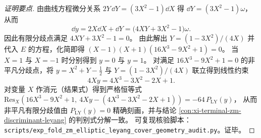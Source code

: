 \begin{proof}[证明要点]
由曲线方程微分关系 \(2Y\,\dd Y=(3X^2-1)\dd X\) 得 \(\dd Y=(3X^2-1)\omega\)，从而
\[
\dd y=2X\dd X+\dd Y=\bigl(4XY+3X^2-1\bigr)\omega.
\]
因此有限分歧点满足 \(4XY+3X^2-1=0\)。
由此解出
\(
Y=(1-3X^2)/(4X)
\)
并代入 \(E\) 的方程，化简即得
\(
(X-1)(X+1)(16X^3-9X^2+1)=0
\)。
当 \(X=1\) 与 \(X=-1\) 时分别得到 \(y=0\) 与 \(y=1\)。
对满足 \(16X^3-9X^2+1=0\) 的非平凡分歧点，将 \(y=X^2+Y-\frac12\) 与 \(Y=(1-3X^2)/(4X)\) 联立得到线性约束
\[
4Xy=4X^3-3X^2-2X+1.
\]
对变量 \(X\) 作消元（结果式）得到严格恒等式
\(
\mathrm{Res}_X(16X^3-9X^2+1,\ 4Xy-(4X^3-3X^2-2X+1))=-64\,P_{\mathrm{LY}}(y)
\)，
从而非平凡有限分歧值由 \(P_{\mathrm{LY}}(y)=0\) 精确刻画，并与结论 \ref{con:xi-terminal-zm-discriminant-leyang} 的判别式分解一致。
可复现核验脚本：\texttt{scripts/exp\_fold\_zm\_elliptic\_leyang\_cover\_geometry\_audit.py}。证毕。
\end{proof}

